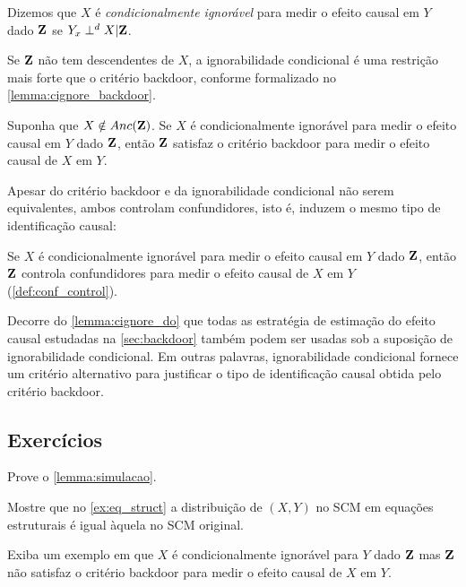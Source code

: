 \begin{definition}
 \label{def:cignore}
 Dizemos que $X$ é \textit{condicionalmente ignorável} para
 medir o efeito causal em $Y$ dado ${\mathbf{Z}}$ se
 $Y_x \perp^d X | {\mathbf{Z}}$.
\end{definition}

Se ${\mathbf{Z}}$ não tem descendentes de $X$, 
a ignorabilidade condicional é
uma restrição mais forte que o critério backdoor,
conforme formalizado no \cref{lemma:cignore_backdoor}.

\begin{lemma}
 \label{lemma:cignore_backdoor}
 Suponha que $X \notin Anc({\mathbf{Z}})$.
 Se $X$ é condicionalmente ignorável para 
 medir o efeito causal em $Y$ dado ${\mathbf{Z}}$, então
 ${\mathbf{Z}}$ satisfaz o critério backdoor para
 medir o efeito causal de $X$ em $Y$.
\end{lemma}

Apesar do critério backdoor e
da ignorabilidade condicional não serem equivalentes,
ambos controlam confundidores, isto é,
induzem o mesmo tipo de identificação causal:

\begin{lemma}
 \label{lemma:cignore_do}
 Se $X$ é condicionalmente ignorável para 
 medir o efeito causal em $Y$ dado ${\mathbf{Z}}$, então
 ${\mathbf{Z}}$ controla confundidores para
 medir o efeito causal de $X$ em $Y$ (\cref{def:conf_control}).
\end{lemma}

Decorre do \cref{lemma:cignore_do} que
todas as estratégia de estimação do efeito causal
estudadas na \cref{sec:backdoor} também
podem ser usadas sob 
a suposição de ignorabilidade condicional.
Em outras palavras, 
ignorabilidade condicional fornece 
um critério alternativo para
justificar o tipo de identificação causal
obtida pelo critério backdoor. 

\subsection{Exercícios}

\begin{exercise}
 Prove o \cref{lemma:simulacao}.
\end{exercise}

\begin{exercise}
 Mostre que no \cref{ex:eq_struct} 
 a distribuição de $(X,Y)$ no SCM 
 em equações estruturais é igual 
 àquela no SCM original.
\end{exercise}

\begin{exercise}
 Exiba um exemplo em que
 $X$ é condicionalmente ignorável para $Y$ dado ${\mathbf{Z}}$ mas
 ${\mathbf{Z}}$ não satisfaz o critério backdoor para
 medir o efeito causal de $X$ em $Y$.
\end{exercise}

